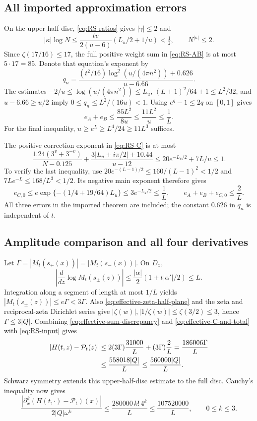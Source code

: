 \documentclass[11pt]{article}
\numberwithin{equation}{section}
\theoremstyle{definition}
\theoremstyle{remark}
\begin{document}
\subsection{All imported approximation errors}
On the upper half-disc, \eqref{eq:RS-ratios} gives $|\gamma|\le2$ and
\[
 |\kappa|\log N
 \le\frac{tv}{2(u-6)}(L_u/2+1/u)<\tfrac12,
 \qquad N^{|\kappa|}\le2.
\]
Since $\zeta(17/16)\le17$, the full positive weight sum in
\eqref{eq:RS-AB} is at most $5\cdot17=85$. Denote that equation's
exponent by
\[
 q_n=\frac{(t^2/16)\log^2(u/(4\pi n^2))+0.626}{u-6.66}.
\]
The estimates $-2/u\le\log(u/(4\pi n^2))\le L_u$,
$(L+1)^2/64+1\le L^2/32$, and $u-6.66\ge u/2$ imply
$0\le q_n\le L^2/(16u)<1$. Using $e^q-1\le2q$ on $[0,1]$ gives
\begin{equation}
 e_A+e_B\le\frac{85L^2}{8u}\le\frac{11L^2}{u}\le\frac1L.
 \label{eq:effective-AB}
\end{equation}
For the final inequality, $u\ge e^L\ge L^4/24\ge11L^3$ suffices.

The positive correction exponent in \eqref{eq:RS-C} is at most
\[
 \frac{1.24(3^v+3^{-v})}{N-0.125}
 +\frac{3|L_u+i\pi/2|+10.44}{u-12}
 \le20e^{-L_u/2}+7L/u\le1.
\]
To verify the last inequality, use
$20e^{-(L-1)/2}\le160/(L-1)^2<1/2$ and
$7Le^{-L}\le168/L^3<1/2$. Its negative main exponent therefore gives
\begin{equation}
 e_{C,0}\le e\exp\{-(1/4+19/64)L_u\}
       \le3e^{-L_u/2}\le\frac1L,
 \qquad e_A+e_B+e_{C,0}\le\frac2L.
 \label{eq:effective-C-and-total}
\end{equation}
All three errors in the imported theorem are included; the constant
$0.626$ in $q_n$ is independent of $t$.

\subsection{Amplitude comparison and all four derivatives}
Let $\Gamma=|M_t(s_+(x))|=|M_t(s_-(x))|$. On $D_x$,
\[
 \left|\frac{d}{dz}\log M_t(s_\pm(z))\right|
 \le\frac{|\alpha|}{2}(1+t|\alpha'|/2)\le L.
\]
Integration along a segment of length at most $1/L$ yields
$|M_t(s_\pm(z))|\le e\Gamma<3\Gamma$. Also
\eqref{eq:effective-zeta-half-plane} and the zeta and reciprocal-zeta
Dirichlet series give
$|\zeta(w)|,|1/\zeta(w)|\le\zeta(3/2)\le3$, hence
$\Gamma\le3|Q|$. Combining \eqref{eq:effective-sum-discrepancy} and
\eqref{eq:effective-C-and-total} with \eqref{eq:RS-input} gives
\begin{align}
 |H(t,z)-\mathcal P_t(z)|
 &\le 2(3\Gamma)\frac{31000}{L}+(3\Gamma)\frac2L
   =\frac{186006\Gamma}{L}
 \notag\\
 &\le\frac{558018|Q|}{L}\le\frac{560000|Q|}{L}.
 \label{eq:effective-disc-error}
\end{align}
Schwarz symmetry extends this upper-half-disc estimate to the full disc.
Cauchy's inequality now gives
\begin{equation}
 \frac{|\partial_x^k(H(t,\cdot)-\mathcal P_t)(x)|}
      {2|Q|\omega^k}
 \le\frac{280000\,k!\,4^k}{L}
 \le\frac{107520000}{L},\qquad 0\le k\le3.
 \label{eq:effective-cauchy-error}
\end{equation}
\end{document}
